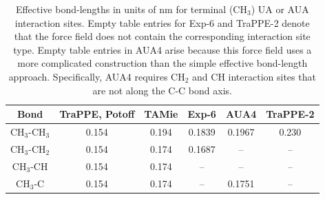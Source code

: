 \documentclass[preprint,letterpaper,floatfix,citeautoscript,aip,jcp]{revtex4-1}
\begin{document}
\begin{table}[h!]
	\caption{Effective bond-lengths in units of nm for terminal (CH$_3$) UA or AUA interaction sites. Empty table entries for Exp-6 and TraPPE-2 denote that the force field does not contain the corresponding interaction site type. Empty table entries in AUA4 arise because this force field uses a more complicated construction than the simple effective bond-length approach. Specifically, AUA4 requires CH$_2$ and CH interaction sites that are not along the C-C bond axis.} \label{tab:bond-lengths}
	\begin{center}
		\begin{tabular}{|c|c|c|c|c|c|}
			\hline
			Bond & TraPPE, Potoff & TAMie & Exp-6 & AUA4 & TraPPE-2 \\ \hline
			CH$_3$-CH$_3$ & 0.154 & 0.194 & 0.1839 & 0.1967 & 0.230 \\ 
			CH$_3$-CH$_2$ & 0.154 & 0.174 & 0.1687 & -- & -- \\ 
			CH$_3$-CH & 0.154 & 0.174 & -- & -- & -- \\
			CH$_3$-C & 0.154 & 0.174 & -- & 0.1751 & -- \\
			\hline
		\end{tabular}
	\end{center} 
\end{table}

\end{document}
